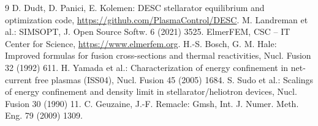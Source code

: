\documentclass[10pt,a4paper]{article}
\begin{document}
\begin{thebibliography}{9}\small
{} D. Dudt, D. Panici, E. Kolemen: DESC stellarator equilibrium and optimization code, \url{https://github.com/PlasmaControl/DESC}.
 M. Landreman et al.: SIMSOPT, J. Open Source Softw. 6 (2021) 3525.
 ElmerFEM, CSC -- IT Center for Science, \url{https://www.elmerfem.org}.
 H.-S. Bosch, G. M. Hale: Improved formulas for fusion cross-sections and thermal reactivities, Nucl. Fusion 32 (1992) 611.
 H. Yamada et al.: Characterization of energy confinement in net-current free plasmas (ISS04), Nucl. Fusion 45 (2005) 1684.
 S. Sudo et al.: Scalings of energy confinement and density limit in stellarator/heliotron devices, Nucl. Fusion 30 (1990) 11.
 C. Geuzaine, J.-F. Remacle: Gmsh, Int. J. Numer. Meth. Eng. 79 (2009) 1309.
\end{thebibliography}
\end{document}
